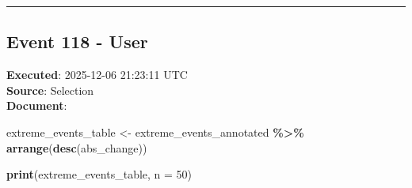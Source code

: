 \documentclass[
  11pt,
]{article}
\newenvironment{Shaded}{\begin{snugshade}}{\end{snugshade}}
\newcommand{\AttributeTok}[1]{\textcolor[rgb]{0.13,0.29,0.53}{#1}}
\newcommand{\DecValTok}[1]{\textcolor[rgb]{0.00,0.00,0.81}{#1}}
\newcommand{\FunctionTok}[1]{\textcolor[rgb]{0.13,0.29,0.53}{\textbf{#1}}}
\newcommand{\NormalTok}[1]{#1}
\newcommand{\OtherTok}[1]{\textcolor[rgb]{0.56,0.35,0.01}{#1}}
\newcommand{\SpecialCharTok}[1]{\textcolor[rgb]{0.81,0.36,0.00}{\textbf{#1}}}
\begin{document}
\begin{center}\rule{0.5\linewidth}{0.5pt}\end{center}

\subsection{Event 118 - User}\label{event-118---user}

\textbf{Executed}: 2025-12-06 21:23:11 UTC\\
\textbf{Source}: Selection\\
\textbf{Document}:

\begin{Shaded}
\begin{Highlighting}[]
\NormalTok{extreme\_events\_table }\OtherTok{\textless{}{-}}\NormalTok{ extreme\_events\_annotated }\SpecialCharTok{\%\textgreater{}\%}
  \FunctionTok{arrange}\NormalTok{(}\FunctionTok{desc}\NormalTok{(abs\_change))}

\FunctionTok{print}\NormalTok{(extreme\_events\_table, }\AttributeTok{n =} \DecValTok{50}\NormalTok{)}
\end{Highlighting}
\end{Shaded}
\end{document}
